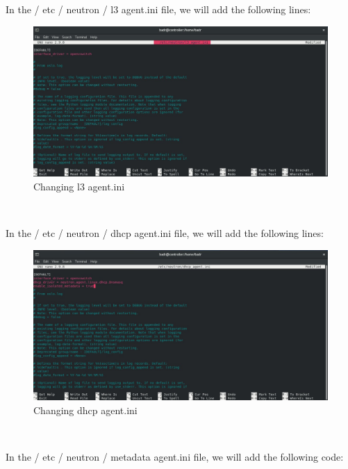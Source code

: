 \begin{spacing}{1.2}
\par In the / etc / neutron / l3 agent.ini file, we will add the following lines: 
\\
\begin{figure}[!htb] 
\begin{center} 
\includegraphics[width=1\linewidth]{Cloud/Installing and Configuring Neutron services/Changing l3_agent.ini} 
\end{center} 
\caption{Changing l3 agent.ini} 
\end{figure} 
\FloatBarrier
\\
\par In the / etc / neutron / dhcp agent.ini file, we will add the following lines: 
\\
\begin{figure}[!htb] 
\begin{center} 
\includegraphics[width=1\linewidth]{Cloud/Installing and Configuring Neutron services/Changing dhcp_agent.ini} 
\end{center} 
\caption{Changing dhcp agent.ini} 
\end{figure} 
\FloatBarrier
\\
\par In the / etc / neutron / metadata agent.ini file, we will add the following code: 

\end{spacing}
